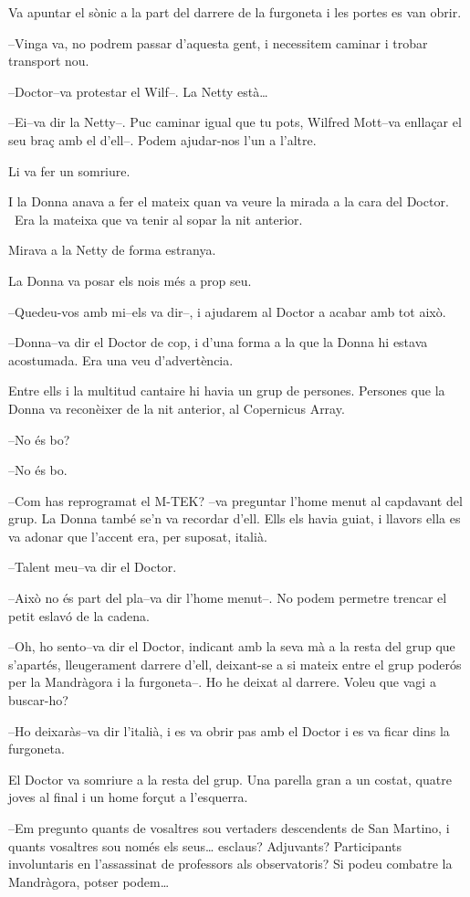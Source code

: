 Va apuntar el sònic a la part del darrere de la furgoneta i les portes
es van obrir.

--Vinga va, no podrem passar d'aquesta gent, i necessitem caminar i
trobar transport nou.

--Doctor--va protestar el Wilf--. La Netty està\ldots{}

--Ei--va dir la Netty--. Puc caminar igual que tu pots, Wilfred Mott--va
enllaçar el seu braç amb el d'ell--. Podem ajudar-nos l'un a l'altre.

Li va fer un somriure.

I la Donna anava a fer el mateix quan va veure la mirada a la cara del
Doctor. ~Era la mateixa que va tenir al sopar la nit anterior.

Mirava a la Netty de forma estranya.

La Donna va posar els nois més a prop seu.

--Quedeu-vos amb mi--els va dir--, i ajudarem al Doctor a acabar amb tot
això.

--Donna--va dir el Doctor de cop, i d'una forma a la que la Donna hi
estava acostumada. Era una veu d'advertència.

Entre ells i la multitud cantaire hi havia un grup de persones. Persones
que la Donna va reconèixer de la nit anterior, al Copernicus Array.

--No és bo?

--No és bo.

--Com has reprogramat el M-TEK? --va preguntar l'home menut al capdavant
del grup. La Donna també se'n va recordar d'ell. Ells els havia guiat, i
llavors ella es va adonar que l'accent era, per suposat, italià.

--Talent meu--va dir el Doctor.

--Això no és part del pla--va dir l'home menut--. No podem permetre
trencar el petit eslavó de la cadena.

--Oh, ho sento--va dir el Doctor, indicant amb la seva mà a la resta del
grup que s'apartés, lleugerament darrere d'ell, deixant-se a si mateix
entre el grup poderós per la Mandràgora i la furgoneta--. Ho he deixat
al darrere. Voleu que vagi a buscar-ho?

--Ho deixaràs--va dir l'italià, i es va obrir pas amb el Doctor i es va
ficar dins la furgoneta.

El Doctor va somriure a la resta del grup. Una parella gran a un costat,
quatre joves al final i un home forçut a l'esquerra.

--Em pregunto quants de vosaltres sou vertaders descendents de San
Martino, i quants vosaltres sou només els seus\ldots{} esclaus?
Adjuvants? Participants involuntaris en l'assassinat de professors als
observatoris? Si podeu combatre la Mandràgora, potser podem\ldots{}

